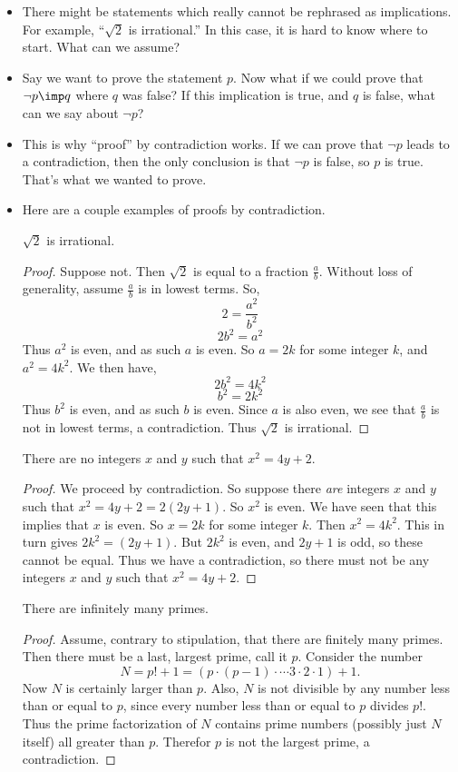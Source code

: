 \begin{itemize}
  \item There might be statements which really cannot be rephrased as implications.  For example, ``$\sqrt 2$ is irrational.''  In this case, it is hard to know where to start. What can we assume? 
  
  \item Say we want to prove the statement $p$.  Now what if we could prove that $\neg p \imp q$ where $q$ was false?  If this implication is true, and $q$ is false, what can we say about $\neg p$?  
  
  \item This is why ``proof'' by contradiction works.  If we can prove that $\neg p$ leads to a contradiction, then the only conclusion is that $\neg p$ is false, so $p$ is true.  That's what we wanted to prove.
  
  \item Here are a couple examples of proofs by contradiction.
  
  \ex $\sqrt{2}$ is irrational.
  
  \begin{proof}
	Suppose not.  Then $\sqrt 2$ is equal to a fraction $\frac{a}{b}$.  Without loss of generality, assume $\frac{a}{b}$ is in lowest terms.  So,
	\[2 = \frac{a^2}{b^2}\]
	\[2b^2 = a^2\]
	Thus $a^2$ is even, and as such $a$ is even.  So $a = 2k$ for some integer $k$, and $a^2 = 4k^2$.  We then have,
	\[2b^2 = 4k^2\]
	\[b^2 = 2k^2\]
	Thus $b^2$ is even, and as such $b$ is even.  Since $a$ is also even, we see that $\frac{a}{b}$ is not in lowest terms, a contradiction.  Thus $\sqrt 2$ is irrational.
\end{proof}
 
    \ex There are no integers $x$ and $y$ such that $x^2  = 4y + 2$. 
\begin{proof}
	We proceed by contradiction.  So suppose there {\em are} integers $x$ and $y$ such that $x^2 = 4y + 2 = 2(2y + 1)$.  So $x^2$ is even.  We have seen that this implies that $x$ is even.  So $x = 2k$ for some integer $k$.  Then $x^2 = 4k^2$.  This in turn gives
	$2k^2 = (2y + 1)$.  But $2k^2$ is even, and $2y + 1$ is odd, so these cannot be equal.  Thus we have a contradiction, so there must not be any integers $x$ and $y$ such that $x^2 = 4y + 2$.
\end{proof}

  \ex There are infinitely many primes.
  
  \begin{proof}
 Assume, contrary to stipulation, that there are finitely many primes.  Then there must be a last, largest prime, call it $p$. Consider the number 
 \[N = p! + 1 = (p \cdot (p-1) \cdot \cdots 3\cdot 2 \cdot 1) + 1.\]
 Now $N$ is certainly larger than $p$.  Also, $N$ is not divisible by any number less than or equal to $p$, since every number less than or equal to $p$ divides $p!$.  Thus the prime factorization of $N$ contains prime numbers (possibly just $N$ itself) all greater than $p$.  Therefor $p$ is not the largest prime, a contradiction. 
\end{proof}

\end{itemize}